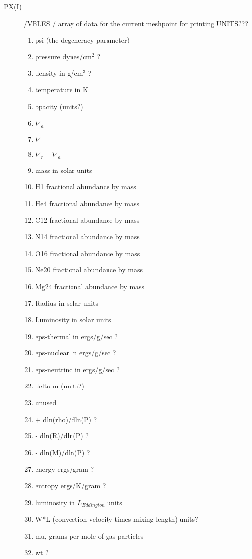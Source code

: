 \documentclass{article}
\begin{document}
\begin{description}
	\item[PX(I)]		/VBLES / array of data for the current meshpoint for printing  UNITS???
		\begin{enumerate}
					\item	psi (the degeneracy parameter)
					\item	pressure dynes/cm$^2$  ?
					\item	density in g/cm$^3$  ?
					\item	temperature in K
					\item	opacity     (units?)
					\item	$\nabla_a$
					\item	$\nabla$
					\item$\nabla_r - \nabla_a$
					\item	mass in solar units
					\item	H1 fractional abundance by mass
					\item	He4 fractional abundance by mass
					\item	C12 fractional abundance by mass
					\item	N14 fractional abundance by mass
					\item	O16 fractional abundance by mass
					\item	Ne20 fractional abundance by mass
					\item	Mg24 fractional abundance by mass
					\item	Radius in solar units
					\item	Luminosity in solar units
					\item	eps-thermal in ergs/g/sec   ?
					\item	eps-nuclear in ergs/g/sec   ?
					\item	eps-neutrino in ergs/g/sec   ?
					\item	delta-m  (units?)
					\item	unused
					\item	+ dln(rho)/dln(P)    ?
					\item	- dln(R)/dln(P)       ?
					\item	- dln(M)/dln(P)      ?
					\item	energy  ergs/gram ?
					\item	entropy  ergs/K/gram ?
					\item	luminosity in $L_{Eddington}$ units
					\item	W*L (convection velocity times mixing length)  units?
					\item	mu, grams per mole of gas particles
					\item	wt  ?

\end{enumerate}
\end{description}
\end{document}
